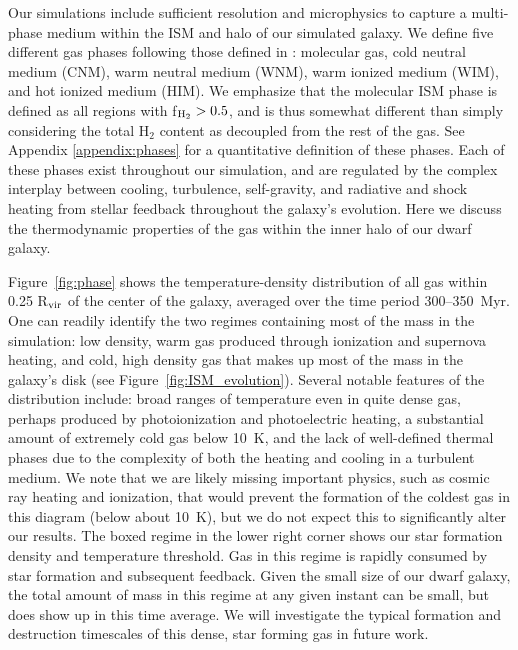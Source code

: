 \documentclass[twocolumn]{aastex61}
\begin{document}
\label{sec:phase}

Our simulations include sufficient resolution and microphysics to capture a multi-phase medium within the ISM and halo of our simulated galaxy. We define five different gas phases following those defined in \citep{Draine2011}: molecular gas, cold neutral medium (CNM), warm neutral medium (WNM), warm ionized medium (WIM), and hot ionized medium (HIM). We emphasize that the molecular ISM phase is defined as all regions with f$_{\rm H_2} > 0.5$, and is thus somewhat different than simply considering the total H$_2$ content as decoupled from the rest of the gas. See Appendix \ref{appendix:phases} for a quantitative definition of these phases. Each of these phases exist throughout our simulation, and are regulated by the complex interplay between cooling, turbulence, self-gravity, and 
  radiative
and shock heating from stellar feedback throughout the galaxy's evolution. Here we discuss the %
   thermodynamic 
properties of the gas within the inner halo of our dwarf galaxy.

Figure~\ref{fig:phase} shows the temperature-density 
    distribution
of all gas within 0.25 R$_{\rm vir}$ of the center of the galaxy, averaged over the time period 300--350~Myr. One can readily identify the two
    regimes containing most of the mass 
in the simulation: low density, warm gas produced through ionization and supernova heating, and cold, high density gas that makes up most of the mass in the galaxy's disk (see Figure~\ref{fig:ISM_evolution}). Several notable features of the 
     distribution
include: broad ranges of temperature even in quite dense gas, perhaps produced by photoionization and photoelectric heating, a substantial amount of extremely cold gas below 10~K, and the lack of well-defined thermal phases due to the complexity of both the heating and cooling in a turbulent medium. We note that we are likely missing important physics, such as cosmic ray heating and ionization, that would prevent the formation of the coldest gas in this diagram (below about 10~K), but we do not expect this to significantly alter our results. The boxed regime in the lower right corner shows our star formation density and temperature threshold. Gas in this regime is rapidly consumed by star formation and subsequent feedback. Given the small size of our dwarf galaxy, the total amount of mass in this regime at any given instant can be small, but does show up in this time average. We will investigate the typical formation and destruction timescales of this dense, star forming gas in future work.
\end{document}
